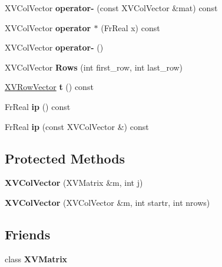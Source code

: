 \begin{CompactItemize}
\item 
\label{XVColVector_a13}
\hypertarget{class_XVColVector_a13}{
XVCol\-Vector {\bf operator-} (const XVCol\-Vector \&mat) const}

\item 
\label{XVColVector_a14}
\hypertarget{class_XVColVector_a14}{
XVCol\-Vector {\bf operator $\ast$} (Fr\-Real x) const}

\item 
\label{XVColVector_a15}
\hypertarget{class_XVColVector_a15}{
XVCol\-Vector {\bf operator-} ()}

\item 
XVCol\-Vector {\bf Rows} (int first\_\-row, int last\_\-row)
\item 
\label{XVColVector_a17}
\hypertarget{class_XVColVector_a17}{
\hyperlink{class_XVRowVector}{XVRow\-Vector} {\bf t} () const}

\item 
\label{XVColVector_a18}
\hypertarget{class_XVColVector_a18}{
Fr\-Real {\bf ip} () const}

\item 
\label{XVColVector_a19}
\hypertarget{class_XVColVector_a19}{
Fr\-Real {\bf ip} (const XVCol\-Vector \&) const}

\end{CompactItemize}
\subsection*{Protected Methods}
\begin{CompactItemize}
\item 
{\bf XVCol\-Vector} (XVMatrix \&m, int j)
\item 
{\bf XVCol\-Vector} (XVCol\-Vector \&m, int startr, int nrows)
\end{CompactItemize}
\subsection*{Friends}
\begin{CompactItemize}
\item 
class {\bf XVMatrix}
\end{CompactItemize}



